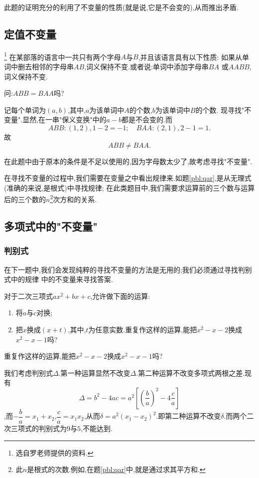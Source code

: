     此题的证明充分的利用了不变量的性质(就是说,它是不会变的),从而推出矛盾.
\subsection{定值不变量}
\begin{problem}\footnote{选自罗老师提供的资料.}
    在某部落的语言中一共只有两个字母$A$与$B$,并且该语言具有以下性质:
    如果从单词中删去相邻的字母串$AB$,词义保持不变.或者说:单词中添加字母串$BA$
    或$AABB$,词义保持不变.

    问:$ABB=BAA$吗?
\end{problem}
\begin{solution}
    记每个单词为$(a,b)$,其中,$a$为该单词中$A$的个数,$b$为该单词中$B$的个数.
    现寻找"不变量".显然,在一串"保义变换"中的$a-b$都是不会变的.而$$ABB:(1,2),1-2=-1;\quad BAA:(2,1),2-1=1.$$
    故$$ABB\neq BAA.$$
\end{solution}
在此题中由于原本的条件是不足以使用的,因为字母数太少了,故考虑寻找"不变量".

在寻找不变量的过程中,我们需要在变量之中看出规律来.如题\ref{pbl:qar},是从无理式(准确的来说,是根式)中寻找规律;
在此类题目中,我们需要求运算前的三个数与运算后的三个数的$n$\footnote{此$n$是根式的次数.例如,在题\ref{pbl:qar}中,就是通过求其平方和.}次方和的关系.
\subsection{多项式中的"不变量"}
\subsubsection{判别式}
在下一题中,我们会发现纯粹的寻找不变量的方法是无用的;我们必须通过寻找判别式中的规律
中的不变量来寻找答案.
\begin{problem}
    对于二次三项式$ax^2+bx+c$,允许做下面的运算:
    \begin{enumerate}
        \item 将$a$与$c$对换;
        \item 把$x$换成$(x+t)$,其中,$t$为任意实数.重复作这样的运算,能把$x^2-x-2$换成$x^2-x-1$吗?
    \end{enumerate}
    重复作这样的运算,能把$x^2-x-2$换成$x^2-x-1$吗?
\end{problem}
\begin{solution}
    我们考虑判别式$\Delta$.第一种运算显然不改变$\Delta$.第二种运算不改变多项式两根之差.现有$$\Delta=b^2-4ac=a^2\left[\left(\dfrac{b}{a}\right)^2-4\dfrac{c}{a}\right]$$,而$-\dfrac{b}{a}=x
    _1+x_2$,$\dfrac{c}{a}=x_1x_2$,从而$\delta=a^2\left( x_1-x_2 \right)^2.$即第二种运算不改变$\delta.$而两个二次三项式的判别式为$9$与$5$,不能达到.
\end{solution}
